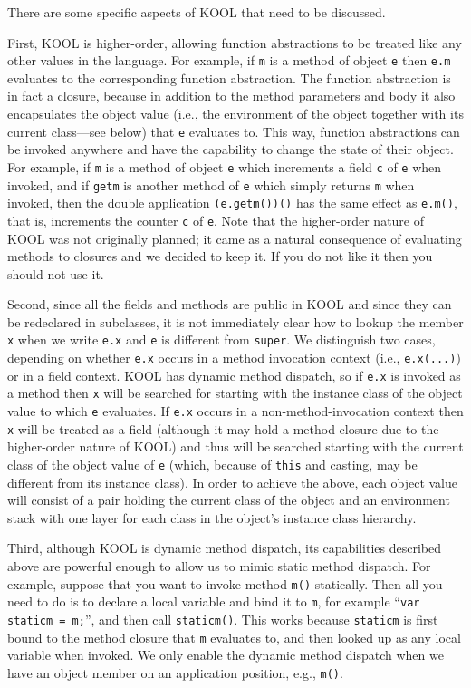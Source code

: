 \begin{kblock}[text]
There are some specific aspects of KOOL that need to be discussed.

First, KOOL is higher-order, allowing function abstractions to be
treated like any other values in the language.  For example, if
\texttt{m} is a method of object \texttt{e} then \texttt{e.m}
evaluates to the corresponding function abstraction.  The function
abstraction is in fact a closure, because in addition to the method
parameters and body it also encapsulates the object value (i.e., the
environment of the object together with its current class---see below)
that \texttt{e} evaluates to.  This way, function abstractions can be
invoked anywhere and have the capability to change the state of their
object.  For example, if \texttt{m} is a method of object \texttt{e}
which increments a field \texttt{c} of \texttt{e} when invoked, and if
\texttt{getm} is another method of \texttt{e} which simply returns
\texttt{m} when invoked, then the double application
\texttt{(e.getm())()} has the same effect as \texttt{e.m()}, that is,
increments the counter \texttt{c} of \texttt{e}.  Note that the
higher-order nature of KOOL was not originally planned; it came as a
natural consequence of evaluating methods to closures and we decided
to keep it.  If you do not like it then you should not use it.

Second, since all the fields and methods are public in KOOL and since
they can be redeclared in subclasses, it is not immediately clear how
to lookup the member \texttt{x} when we write \texttt{e.x} and
\texttt{e} is different from \texttt{super}.  We distinguish two cases,
depending on whether \texttt{e.x} occurs in a method invocation
context (i.e., \texttt{e.x(...)}) or in a field context.  KOOL has
dynamic method dispatch, so if \texttt{e.x} is invoked as a method
then \texttt{x} will be searched for starting with the instance class of
the object value to which \texttt{e} evaluates.  If \texttt{e.x}
occurs in a non-method-invocation context then \texttt{x} will be
treated as a field (although it may hold a method closure due to the
higher-order nature of KOOL) and thus will be searched starting with
the current class of the object value of \texttt{e} (which, because of
\texttt{this} and casting, may be different from its instance class).
In order to achieve the above, each object value will consist of a
pair holding the current class of the object and an environment stack
with one layer for each class in the object's instance class hierarchy.

Third, although KOOL is dynamic method dispatch, its capabilities
described above are powerful enough to allow us to mimic static
method dispatch.  For example, suppose that you want to invoke method
\texttt{m()} statically.  Then all you need to do is to declare a
local variable and bind it to \texttt{m}, for example ``\texttt{var
staticm = m;}'', and then call \texttt{staticm()}.  This works because
\texttt{staticm} is first bound to the method closure that \texttt{m}
evaluates to, and then looked up as any local variable when invoked.
We only enable the dynamic method dispatch when we have an object
member on an application position, e.g., \texttt{m()}.


\end{kblock}
